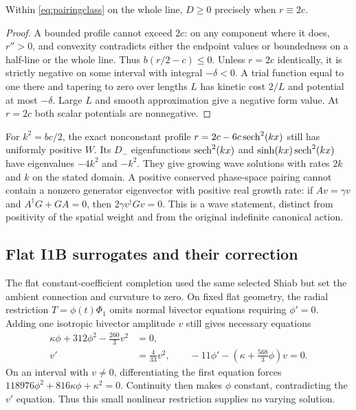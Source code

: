 \begin{proposition}
Within \eqref{eq:pairingclass} on the whole line, $D\ge0$ precisely when
$r\equiv2c$.
\end{proposition}
\begin{proof}
A bounded profile cannot exceed $2c$: on any component where it does,
$r''>0$, and convexity contradicts either the endpoint values or
boundedness on a half-line or the whole line. Thus $b(r/2-c)\le0$.
Unless $r=2c$ identically, it is strictly negative on some interval with
integral $-\delta<0$. A trial function equal to one there and tapering
to zero over lengths $L$ has kinetic cost $2/L$ and potential at most
$-\delta$. Large $L$ and smooth approximation give a negative form
value. At $r=2c$ both scalar potentials are nonnegative.
\end{proof}

For $k^2=bc/2$, the exact nonconstant profile
$r=2c-6c\operatorname{sech}^2(kx)$ still has uniformly positive $W$.
Its $D_-$ eigenfunctions $\operatorname{sech}^2(kx)$ and
$\sinh(kx)\operatorname{sech}^2(kx)$ have eigenvalues $-4k^2$ and $-k^2$.
They give growing wave solutions with rates $2k$ and $k$ on the stated
domain. A positive conserved phase-space pairing cannot contain a
nonzero generator eigenvector with positive real growth rate: if
$Av=\gamma v$ and $A^\dagger G+GA=0$, then
$2\gamma v^\dagger Gv=0$. This is a wave statement, distinct from
positivity of the spatial weight and from the original indefinite
canonical action.

\subsection{Flat I1B surrogates and their correction}
\label{sec:flat}
The flat constant-coefficient completion used the same selected Shiab
but set the ambient connection and curvature to zero. On fixed flat
geometry, the radial restriction $T=\phi(t)\Phi_1$ omits normal bivector
equations requiring $\phi'=0$. Adding one isotropic bivector amplitude
$v$ still gives necessary equations
\begin{align}
 \kappa\phi+312\phi^2-\tfrac{260}{3}v^2&=0,\nonumber\\
 v'&=\tfrac4{33}v^2,\qquad
 -11\phi'-(\kappa+\tfrac{568}{3}\phi)v=0.\label{eq:flatclosure}
\end{align}
On an interval with $v\ne0$, differentiating the first equation forces
$118976\phi^2+816\kappa\phi+\kappa^2=0$.
Continuity then makes $\phi$ constant, contradicting the $v'$ equation.
Thus this small nonlinear restriction supplies no varying solution.

